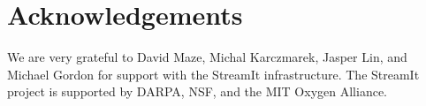 \section{Acknowledgements}

We are very grateful to David Maze, Michal Karczmarek, Jasper Lin, and
Michael Gordon for support with the StreamIt infrastructure.  The
StreamIt project is supported by DARPA, NSF, and the MIT Oxygen
Alliance.